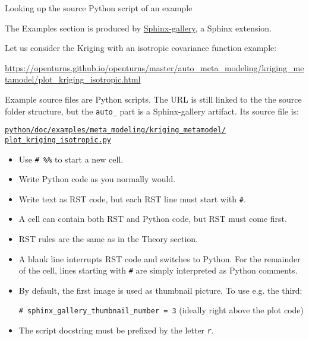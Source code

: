 \documentclass[8pt]{beamer}
\begin{document}
\begin{frame}{Looking up the source Python script of an example}

The Examples section is produced by \href{https://sphinx-gallery.github.io/stable/index.html}{\alert{Sphinx-gallery}}, a Sphinx extension.

Let us consider the \alert{Kriging with an isotropic covariance function} example:

\url{https://openturns.github.io/openturns/master/auto_meta_modeling/kriging_metamodel/plot_kriging_isotropic.html}

Example source files are \alert{Python scripts}.
The URL is still linked to the the source folder structure,
but the \texttt{auto\_} part is a Sphinx-gallery artifact. Its source file is:

\href{https://github.com/openturns/openturns/blob/master/python/doc/examples/meta_modeling/kriging_metamodel/plot_kriging_isotropic.py}{\texttt{python/doc/examples/meta\_modeling/kriging\_metamodel/\\plot\_kriging\_isotropic.py}}

\begin{itemize}
    \item Use \alert{\texttt{\# \%\%}} to start a \alert{new cell}.
    \item Write \alert{Python code} as you \alert{normally} would.
    \item Write \alert{text as RST code}, but each RST line must start with \alert{\texttt{\#}}.
    \item A cell can contain both RST and Python code, but \alert{RST must come first}.  
    \item \alert{RST rules are the same} as in the Theory section.
    \item A \alert{blank line} interrupts RST code and \alert{switches to Python}. For the remainder of the cell, lines starting with \alert{\texttt{\#}} are simply interpreted as Python comments.
    \item By default, the first image is used as \alert{thumbnail picture}. To use e.g. the third: %

    \texttt{\# sphinx\_gallery\_thumbnail\_number = 3} (ideally right above the plot code)
    \item The \alert{script docstring} must be prefixed by the letter \texttt{r}.
\end{itemize}

\end{frame}
\end{document}
